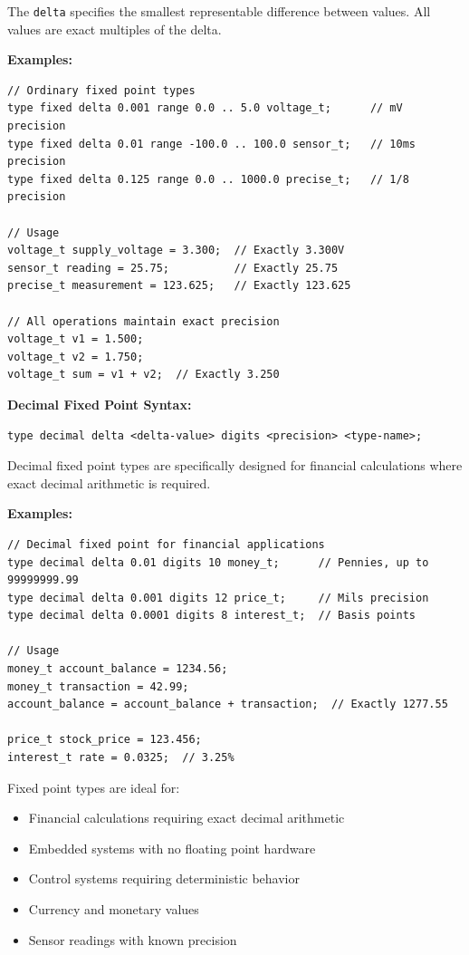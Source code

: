 \documentclass[11pt,letterpaper,twoside,openany]{book}
\begin{document}
The \verb'delta' specifies the smallest representable difference between values. All values are exact multiples of the delta.

\textbf{Examples:}
\begin{lstlisting}
// Ordinary fixed point types
type fixed delta 0.001 range 0.0 .. 5.0 voltage_t;      // mV precision
type fixed delta 0.01 range -100.0 .. 100.0 sensor_t;   // 10ms precision
type fixed delta 0.125 range 0.0 .. 1000.0 precise_t;   // 1/8 precision

// Usage
voltage_t supply_voltage = 3.300;  // Exactly 3.300V
sensor_t reading = 25.75;          // Exactly 25.75
precise_t measurement = 123.625;   // Exactly 123.625

// All operations maintain exact precision
voltage_t v1 = 1.500;
voltage_t v2 = 1.750;
voltage_t sum = v1 + v2;  // Exactly 3.250
\end{lstlisting}

\textbf{Decimal Fixed Point Syntax:}
\begin{lstlisting}
type decimal delta <delta-value> digits <precision> <type-name>;
\end{lstlisting}

Decimal fixed point types are specifically designed for financial calculations where exact decimal arithmetic is required.

\textbf{Examples:}
\begin{lstlisting}
// Decimal fixed point for financial applications
type decimal delta 0.01 digits 10 money_t;      // Pennies, up to 99999999.99
type decimal delta 0.001 digits 12 price_t;     // Mils precision
type decimal delta 0.0001 digits 8 interest_t;  // Basis points

// Usage
money_t account_balance = 1234.56;
money_t transaction = 42.99;
account_balance = account_balance + transaction;  // Exactly 1277.55

price_t stock_price = 123.456;
interest_t rate = 0.0325;  // 3.25%
\end{lstlisting}

Fixed point types are ideal for:
\begin{itemize}
\item Financial calculations requiring exact decimal arithmetic
\item Embedded systems with no floating point hardware
\item Control systems requiring deterministic behavior
\item Currency and monetary values
\item Sensor readings with known precision
\end{itemize}
\end{document}
